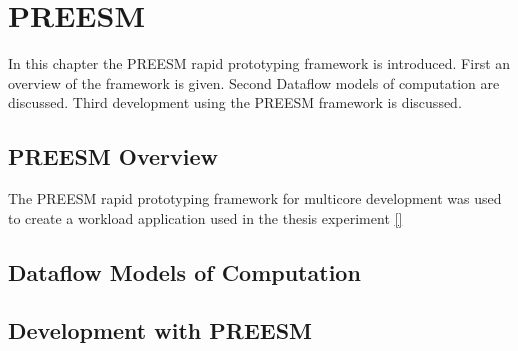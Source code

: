 \chapter{PREESM}
\label{chapter:preesm}
In this chapter the PREESM rapid prototyping framework is introduced. First an
overview of the framework is given. Second Dataflow models of computation are
discussed. Third development using the PREESM framework is discussed.

\section{PREESM Overview}
\label{sec:preesmover}
The PREESM rapid prototyping framework for multicore development was used to
create a workload application used in the thesis experiment \ref{} 
\section{Dataflow Models of Computation}
\label{sec:dataflow}

\section{Development with PREESM}
\label{sec:preesmdev}
